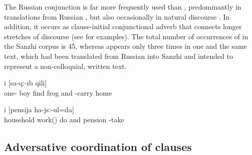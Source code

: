The Russian conjunction  is far more frequently used than , predominantly in translations from Russian , but also occasionally in natural discourse . In addition, it occurs as clause-initial conjunctional adverb   that connects longer stretches of discourse (see  for examples). The total number of occurrences of  in the Sanzhi corpus is 45, whereas   appears only three times in one and the same text, which had been translated from Russian into Sanzhi and intended to represent a non-colloquial, written text.
%
\begin{exe}
	\ex	\label{ex:‎‎‎Once a boy found a frog and brought it home}
		i	[sa-qː-ib	qili]\\
		one-	boy	find frog	and	-carry	home\\
	\glt	{}

	\ex	\label{ex:‎I am doing my house work and get a pension.}
	\gll	[di-la	xazajstweni	ʡaˁči	d-irq'-ul=da]	i	[pensija	ha-jsː-ul=da]\\
			household	work()	do	and	pension	-take\\
	\glt	{}
\end{exe}



\subsection{Adversative coordination of clauses}
\label{ssec:Adversative coordination of clauses}

